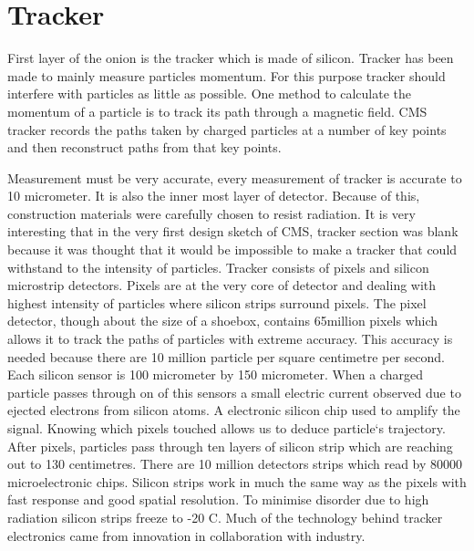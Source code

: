 \documentclass[11pt, oneside]{article}   	%
\begin{document}
\section{Tracker}

First layer of the onion is the tracker which is made of silicon. Tracker has been made to mainly measure particles momentum. For this purpose tracker should interfere with particles
as little as possible. One method to calculate the momentum of a particle is to track its path through a magnetic field. CMS tracker records the paths taken by charged particles 
at a number of key points and then reconstruct paths from that key points.

Measurement must be very accurate, every measurement of tracker is accurate to 10 micrometer. 
It is also the inner most layer of detector. Because of this, construction materials were carefully chosen to resist radiation. It is very interesting that in the very 
first design sketch of CMS, tracker section was blank because it was thought that it would be impossible to make a tracker that could withstand to the intensity of particles.
Tracker consists of pixels and silicon microstrip detectors. Pixels are at the very core of detector and dealing with highest intensity of particles where silicon strips surround pixels. 
The pixel detector, though about the size of a shoebox, contains 65million pixels which allows it to track the paths of particles with extreme accuracy. This accuracy is needed because there 
are 10 million particle per square centimetre per second. Each silicon sensor is 100 micrometer by 150 micrometer. When a charged particle passes through on of this sensors a small electric current
observed due to ejected electrons from silicon atoms. A electronic silicon chip used to amplify the signal. Knowing which pixels touched allows us to deduce particle`s trajectory.
After pixels, particles pass through ten layers of silicon strip which are reaching out to 130 centimetres. There are 10 million detectors strips which read by 80000 microelectronic chips.
Silicon strips work in much the same way as the pixels with fast response and good spatial resolution. To minimise disorder due to high radiation silicon strips freeze to -20 C. Much of the
technology behind tracker electronics came from innovation in collaboration with industry.
\end{document}
